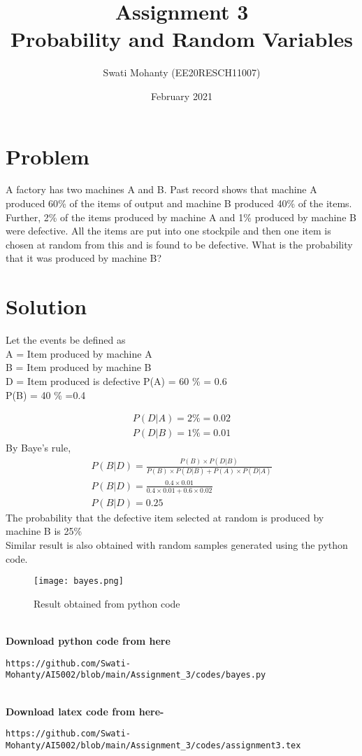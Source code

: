 \documentclass[journal,12pt,twocolumn]{IEEEtran}
\title{Assignment 3
\\Probability and Random Variables }
\author{Swati Mohanty (EE20RESCH11007) }
\date{February 2021}
\begin{document}
\maketitle


\section{Problem}
A factory has two machines A and B. Past
record shows that machine A produced
60{\%} of the items of output and machine
B produced 40{\%} of the items. Further, 2{\%}
of the items produced by machine A and
1{\%} produced by machine B were defective.
All the items are put into one stockpile and
then one item is chosen at random from this
and is found to be defective. What is the
probability that it was produced by machine B?

\section{Solution}
Let the events be defined as
\\A = Item produced by machine A
\\B = Item produced by machine B
\\D = Item produced is defective
P(A) = 60 {\%} = 0.6\\
P(B) = 40 {\%} =0.4

\begin{align}
    P(D|A)  = 2 {\%} =0.02
   \\P(D|B) =  1 {\%} =0.01
\end{align}
By Baye's rule,
\begin{align}
    P(B|D) = \frac{P(B)\times P(D|B)}{P(B)\times P(D|B) + P(A)\times P(D|A)}
    \\P(B|D) = \frac{0.4\times 0.01}{0.4\times 0.01 + 0.6\times 0.02}
    \\P(B|D) = 0.25
\end{align}
The probability that the defective item selected at random is produced by machine B is 25{\%}
\\Similar  result is also obtained with random samples generated using the python code.
\begin{figure}[h]
\renewcommand{\theenumi}{1}
\centering
\texttt{[image: bayes.png]}
\caption{Result obtained from python code }
\label{Fig:1}
\end{figure}
\\\textbf{Download python code from here}\\
\begin{lstlisting}
https://github.com/Swati-Mohanty/AI5002/blob/main/Assignment_3/codes/bayes.py
\end{lstlisting}
\\\textbf{Download latex code from here-}\\
\begin{lstlisting}
https://github.com/Swati-Mohanty/AI5002/blob/main/Assignment_3/codes/assignment3.tex
\end{lstlisting}
\end{document}
